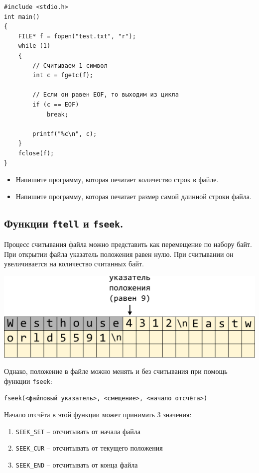 \documentclass{article}
\begin{document}
\begin{lstlisting}
#include <stdio.h>
int main()
{
    FILE* f = fopen("test.txt", "r");
    while (1)
    {
        // Считываем 1 символ
        int c = fgetc(f);
		
        // Если он равен EOF, то выходим из цикла
        if (c == EOF)
            break;
            
        printf("%c\n", c);
	}
    fclose(f);
}
\end{lstlisting}

\begin{itemize}
\item Напишите программу, которая печатает количество строк в файле.
\item Напишите программу, которая печатает размер самой длинной строки файла.
\end{itemize}

\subsection*{Функции \texttt{ftell} и \texttt{fseek}.}

Процесс считывания файла можно представить как перемещение по набору байт. При открытии файла указатель положения равен нулю. При считывании он увеличивается на количество считанных байт.
\begin{center}
\includegraphics[scale=0.8]{../images/positioninfile.png}
\end{center}

Однако, положение в файле можно менять и без считывания при помощь функции \texttt{fseek}:
\begin{verbatim}
fseek(<файловый указатель>, <смещение>, <начало отсчёта>)
\end{verbatim}
Начало отсчёта в этой функции может принимать 3 значения:
\begin{enumerate}
\item \texttt{SEEK\_SET} -- отсчитывать от начала файла
\item \texttt{SEEK\_CUR} -- отсчитывать от текущего положения
\item \texttt{SEEK\_END} -- отсчитывать от конца файла
\end{enumerate}
\end{document}

